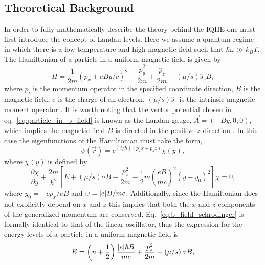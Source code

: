 \subsection{Theoretical Background}\label{subsec:IQHE_theory}
In order to fully mathematically describe the theory behind the \acs{IQHE} one must first introduce the concept of Landau levels. Here we assume a quantum regime in which there is a low temperature and high magnetic field such that $\hbar\omega\gg k_B T$. The Hamiltonian of a particle in a uniform magnetic field is given by 
\begin{equation}\label{eq:particle_in_b_field}
H = \frac{1}{2m}\left(\hat{p}_x+eBy/c\right)^2 + \frac{\hat{p}_y^2}{2m} + \frac{\hat{p}_z}{2m} - \left(\mu/s\right)\hat{s}_z B,
\end{equation}
where $\hat{p}_i$ is the momentum operator in the specified coordinate direction, $B$ is the magnetic field, $e$ is the charge of an electron, $\left(\mu/s\right)\hat{s}_z$ is the intrinsic magnetic moment operator \cite{Landau_Quantum1965}. It is worth noting that the vector potential chosen in eq.~\ref{eq:particle_in_b_field} is known as the Landau gauge, $\vec{A} = \left(-By, 0, 0\right)$, which implies the magnetic field $B$ is directed in the positive $z$-direction \cite{Sakurai_Quantum1994,Landau_Diagmagnetismus1930}. In this case the eigenfunctions of the Hamiltonian must take the form,
\begin{equation}\label{eq:psi_b_field}
\psi\left(\vec{r}\right) = e^{\left(i/\hbar\right)\left(p_x x+p_z z\right)}\chi\left(y\right),
\end{equation} 
where $\chi\left(y\right)$ is defined by 
\begin{equation}\label{eq:b_field_schrodinger}
	\frac{\partial \chi}{\partial y} + \frac{2m}{\hbar^2}\left[E +\left(\mu/s\right)\sigma B - \frac{p_z^2}{2m}-\frac{1}{2}m\left(\frac{e B}{mc}\right)^2\left(y-y_0\right)^2\right]\chi = 0,
\end{equation}
where $y_0 =-c p_x/e B$ and $\omega = \abs{e}B/m c$. Additionally, since the Hamiltonian does not explicitly depend on $x$ and $z$ this implies that both the $x$ and $z$ components of the generalized momentum are conserved. Eq.~\ref{eq:b_field_schrodinger} is formally identical to that of the linear oscillator, thus the expression for the energy levels of a particle in a uniform magnetic field is 
\begin{equation}\label{eq:landau_levels_3D}
	E = \left(n+\frac{1}{2}\right)\frac{\abs{e}\hbar B}{mc} + \frac{p_z^2}{2m} - \left(\mu/s\right)\sigma B,
\end{equation}
